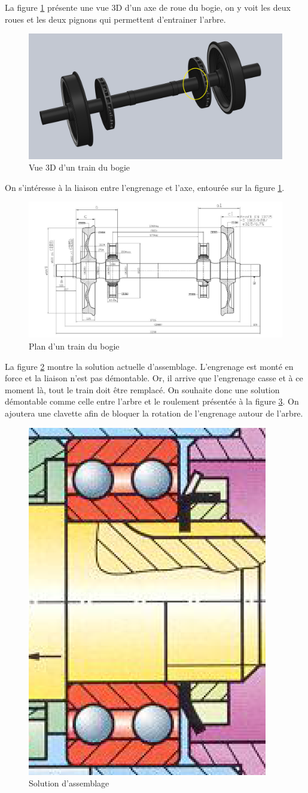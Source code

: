 La figure \ref{img23} présente une vue 3D d'un axe de roue du bogie, on y voit les deux roues et les deux pignons qui permettent d'entrainer l'arbre.

\begin{figure}[!h]
 \centering\includegraphics[width=0.6\linewidth]{img/fig23}
 \caption{Vue 3D d'un train du bogie}
 \label{img23}
\end{figure}

On s'intéresse à la liaison entre l'engrenage et l'axe, entourée sur la figure \ref{img23}.

\begin{figure}[!h]
 \centering\includegraphics[width=0.9\linewidth]{img/fig24}
 \caption{Plan d'un train du bogie}
 \label{img24}
\end{figure}

La figure \ref{img24} montre la solution actuelle d'assemblage. L'engrenage est monté en force et la liaison n'est pas démontable. Or, il arrive que l'engrenage casse et à ce moment là, tout le train doit être remplacé. On souhaite donc une solution démontable comme celle entre l'arbre et le roulement présentée à la figure \ref{img25}. On ajoutera une clavette afin de bloquer la rotation de l'engrenage autour de l'arbre.

\begin{figure}[!h]
 \centering\includegraphics[width=0.4\linewidth]{img/fig25}
 \caption{Solution d'assemblage}
 \label{img25}
\end{figure}

